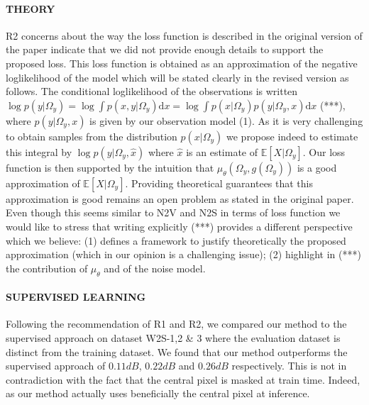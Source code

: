 \documentclass{article}
\begin{document}
\paragraph{THEORY}
R2 concerns about the way the loss function is described in the original version of the paper indicate that we did not provide enough details to support the proposed loss. This loss function is obtained as an approximation of the negative loglikelihood of the model which will be stated clearly in the revised version as follows.
The conditional loglikelihood of the observations is written $ \log p(y|\Omega_y) = \log \int p(x,y|\Omega_y) \mathrm{d}x = \log \int p(x|\Omega_y)p(y|\Omega_y,x) \mathrm{d}x$ (***), where $p(y|\Omega_y,x)$ is given by our observation model (1).
As it is very challenging to obtain samples from the distribution $p(x|\Omega_y)$ we propose indeed to estimate this integral by $\log p(y|\Omega_y,\hat {x})$ where $\hat {x}$ is an estimate of $\mathbb{E}[X|\Omega_y]$. Our loss function is then supported by the intuition that $\mu_\theta(\Omega_y,g(\Omega_y))$ is a good approximation of $\mathbb{E}[X|\Omega_y]$. Providing theoretical guarantees  that this approximation is good remains an open problem as stated in the original paper. Even though this seems similar to N2V and N2S in terms of loss function we would like to stress that writing explicitly (***) provides a different perspective which we believe:
(1) defines a framework to justify theoretically the proposed approximation (which in our opinion is a challenging issue); (2) highlight in (***) the contribution of $\mu_\theta$ and of the noise model.

\paragraph{SUPERVISED LEARNING}
Following the recommendation of R1 and R2, we compared our method to the supervised approach on dataset W2S-1,2 \& 3 where the evaluation dataset is distinct from the training dataset. We found that our method outperforms the supervised approach of $0.11dB$, $0.22dB$ and $0.26dB$ respectively. This is not in contradiction with the fact that the central pixel is masked at train time. Indeed, as our method actually uses beneficially the central pixel at inference.
\end{document}
